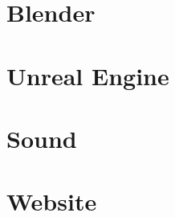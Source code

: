 \documentclass[
    headings=optiontotocandhead,%
    twoside,
    numbers=noenddot,%
    toc=flat, %
    12pt, %
    titlepage, %
    parskip=full, %
    listof=totoc, %
    listof=flat, %
    numbers=noenddot, %
    bibliography=totoc, %
    a4paper,DIV=14,
    BCOR=15mm,
]{scrbook}
\begin{document}


%

\chapter{Blender}

\renewcommand{\kapitelautor}{}



\chapter{Unreal Engine}

\renewcommand{\kapitelautor}{}


\chapter{Sound}

\renewcommand{\kapitelautor}{}



\chapter{Website}

\renewcommand{\kapitelautor}{}




\end{document}

